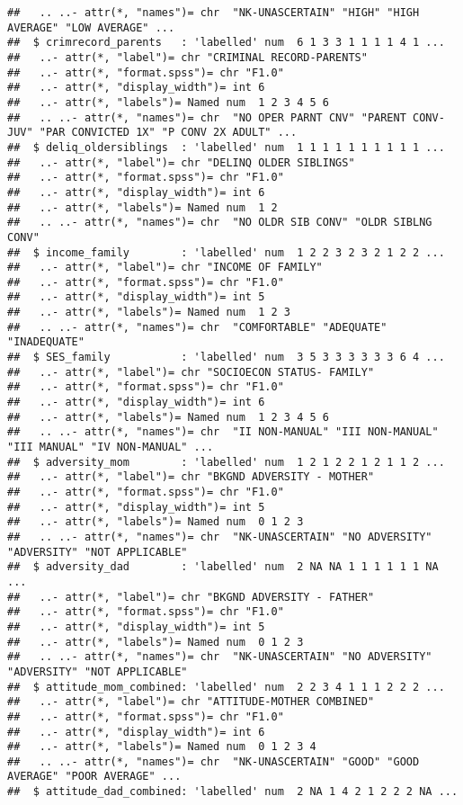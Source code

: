 \documentclass[]{tufte-handout}
\begin{document}
\begin{verbatim}
##   .. ..- attr(*, "names")= chr  "NK-UNASCERTAIN" "HIGH" "HIGH AVERAGE" "LOW AVERAGE" ...
##  $ crimrecord_parents   : 'labelled' num  6 1 3 3 1 1 1 1 4 1 ...
##   ..- attr(*, "label")= chr "CRIMINAL RECORD-PARENTS"
##   ..- attr(*, "format.spss")= chr "F1.0"
##   ..- attr(*, "display_width")= int 6
##   ..- attr(*, "labels")= Named num  1 2 3 4 5 6
##   .. ..- attr(*, "names")= chr  "NO OPER PARNT CNV" "PARENT CONV-JUV" "PAR CONVICTED 1X" "P CONV 2X ADULT" ...
##  $ deliq_oldersiblings  : 'labelled' num  1 1 1 1 1 1 1 1 1 1 ...
##   ..- attr(*, "label")= chr "DELINQ OLDER SIBLINGS"
##   ..- attr(*, "format.spss")= chr "F1.0"
##   ..- attr(*, "display_width")= int 6
##   ..- attr(*, "labels")= Named num  1 2
##   .. ..- attr(*, "names")= chr  "NO OLDR SIB CONV" "OLDR SIBLNG CONV"
##  $ income_family        : 'labelled' num  1 2 2 3 2 3 2 1 2 2 ...
##   ..- attr(*, "label")= chr "INCOME OF FAMILY"
##   ..- attr(*, "format.spss")= chr "F1.0"
##   ..- attr(*, "display_width")= int 5
##   ..- attr(*, "labels")= Named num  1 2 3
##   .. ..- attr(*, "names")= chr  "COMFORTABLE" "ADEQUATE" "INADEQUATE"
##  $ SES_family           : 'labelled' num  3 5 3 3 3 3 3 3 6 4 ...
##   ..- attr(*, "label")= chr "SOCIOECON STATUS- FAMILY"
##   ..- attr(*, "format.spss")= chr "F1.0"
##   ..- attr(*, "display_width")= int 6
##   ..- attr(*, "labels")= Named num  1 2 3 4 5 6
##   .. ..- attr(*, "names")= chr  "II NON-MANUAL" "III NON-MANUAL" "III MANUAL" "IV NON-MANUAL" ...
##  $ adversity_mom        : 'labelled' num  1 2 1 2 2 1 2 1 1 2 ...
##   ..- attr(*, "label")= chr "BKGND ADVERSITY - MOTHER"
##   ..- attr(*, "format.spss")= chr "F1.0"
##   ..- attr(*, "display_width")= int 5
##   ..- attr(*, "labels")= Named num  0 1 2 3
##   .. ..- attr(*, "names")= chr  "NK-UNASCERTAIN" "NO ADVERSITY" "ADVERSITY" "NOT APPLICABLE"
##  $ adversity_dad        : 'labelled' num  2 NA NA 1 1 1 1 1 1 NA ...
##   ..- attr(*, "label")= chr "BKGND ADVERSITY - FATHER"
##   ..- attr(*, "format.spss")= chr "F1.0"
##   ..- attr(*, "display_width")= int 5
##   ..- attr(*, "labels")= Named num  0 1 2 3
##   .. ..- attr(*, "names")= chr  "NK-UNASCERTAIN" "NO ADVERSITY" "ADVERSITY" "NOT APPLICABLE"
##  $ attitude_mom_combined: 'labelled' num  2 2 3 4 1 1 1 2 2 2 ...
##   ..- attr(*, "label")= chr "ATTITUDE-MOTHER COMBINED"
##   ..- attr(*, "format.spss")= chr "F1.0"
##   ..- attr(*, "display_width")= int 6
##   ..- attr(*, "labels")= Named num  0 1 2 3 4
##   .. ..- attr(*, "names")= chr  "NK-UNASCERTAIN" "GOOD" "GOOD AVERAGE" "POOR AVERAGE" ...
##  $ attitude_dad_combined: 'labelled' num  2 NA 1 4 2 1 2 2 2 NA ...

\end{verbatim}
\end{document}
